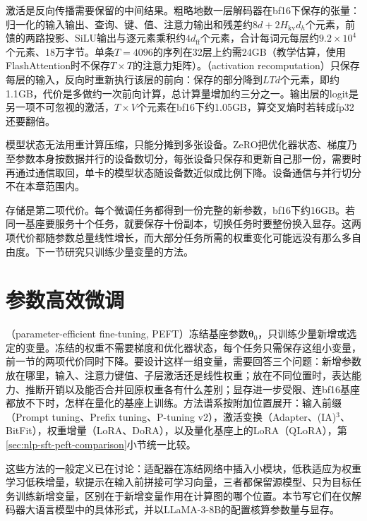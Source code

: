 激活是反向传播需要保留的中间结果。粗略地数一层解码器在bf16下保存的张量：归一化的输入输出、查询、键、值、注意力输出和残差约$8d+2H_{\mathrm{kv}}d_h$个元素，前馈的两路投影、SiLU输出与逐元素乘积约$4d_{\mathrm{ff}}$个元素，合计每词元每层约$9.2\times10^4$个元素、18万字节。单条$T=4096$的序列在32层上约需24GB（教学估算，使用FlashAttention时不保存$T\times T$的注意力矩阵）。（activation recomputation）只保存每层的输入，反向时重新执行该层的前向：保存的部分降到$LTd$个元素，即约1.1GB，代价是多做约一次前向计算，总计算量增加约三分之一。输出层的logit是另一项不可忽视的激活，$T\times V$个元素在bf16下约1.05GB，算交叉熵时若转成fp32还要翻倍。

模型状态无法用重计算压缩，只能分摊到多张设备。ZeRO把优化器状态、梯度乃至参数本身按数据并行的设备数切分，每张设备只保存和更新自己那一份，需要时再通过通信取回，单卡的模型状态随设备数近似成比例下降。设备通信与并行切分不在本章范围内。

存储是第二项代价。每个微调任务都得到一份完整的新参数，bf16下约16GB。若同一基座要服务十个任务，就要保存十份副本，切换任务时要整份换入显存。这两项代价都随参数总量线性增长，而大部分任务所需的权重变化可能远没有那么多自由度。下一节研究只训练少量变量的方法。

\section{参数高效微调}
\label{sec:nlp-sft-peft}

（parameter-efficient fine-tuning, PEFT）冻结基座参数$\bm\theta_0$，只训练少量新增或选定的变量。冻结的权重不需要梯度和优化器状态，每个任务只需保存这组小变量，前一节的两项代价同时下降。要设计这样一组变量，需要回答三个问题：新增参数放在哪里，输入、注意力键值、子层激活还是线性权重；放在不同位置时，表达能力、推断开销以及能否合并回原权重各有什么差别；显存进一步受限、连bf16基座都放不下时，怎样在量化的基座上训练。方法谱系按附加位置展开：输入前缀（Prompt tuning、Prefix tuning、P-tuning v2），激活变换（Adapter、(IA)$^3$、BitFit），权重增量（LoRA、DoRA），以及量化基座上的LoRA（QLoRA），第\ref{sec:nlp-sft-peft-comparison}小节统一比较。

这些方法的一般定义已在讨论：适配器在冻结网络中插入小模块，低秩适应为权重学习低秩增量，软提示在输入前拼接可学习向量，三者都保留源模型、只为目标任务训练新增变量，区别在于新增变量作用在计算图的哪个位置。本节写它们在仅解码器大语言模型中的具体形式，并以LLaMA-3-8B的配置核算参数量与显存。


